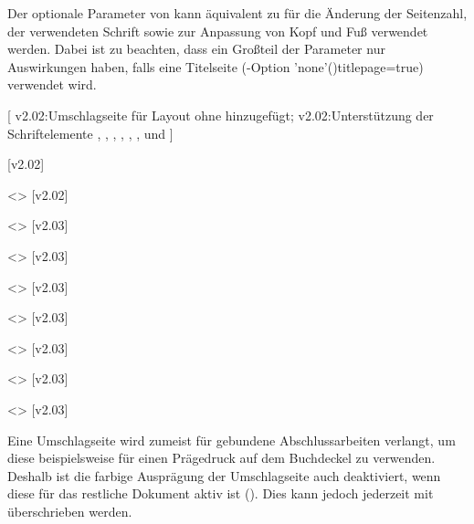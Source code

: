\begin{DeclareEntity*}{}
\begin{DeclareEntity*}{}
\begin{DeclareEntity*}{}
\begin{Declaration}
Der optionale Parameter von  kann äquivalent zu 
 für die Änderung der Seitenzahl, der verwendeten Schrift 
sowie zur Anpassung von Kopf und Fuß verwendet werden. Dabei ist zu beachten, 
dass ein Großteil der Parameter nur Auswirkungen haben, falls eine Titelseite
(\KOMAScript-Option \Option'none'(){titlepage=true}) 
verwendet wird.
\end{Declaration}

\begin{Declaration}
  {}
[%
  v2.02:Umschlagseite für Layout ohne \CD hinzugefügt;%
  v2.02:Unterstützung der Schriftelemente , 
    , , , , 
    ,  und %
]
\begin{Declaration}
  {}
  [v2.02]
\begin{Declaration}
  {}
\begin{Declaration}
  {}
  <>
  [v2.02]
\begin{Declaration}
  {}
  <>
  [v2.03]
\begin{Declaration}
  {}
  <>
  [v2.03]
\begin{Declaration}
  {}
  <>
  [v2.03]
\begin{Declaration}
  {}
  <>
  [v2.03]
\begin{Declaration}
  {}
  <>
  [v2.03]
\begin{Declaration}
  {}
  <>
  [v2.03]
\begin{Declaration}
  {}
  <>
  [v2.03]
\printdeclarationlist[Umschlagseite|!]

Eine Umschlagseite wird zumeist für gebundene Abschlussarbeiten verlangt, um 
diese beispielsweise für einen Prägedruck auf dem Buchdeckel zu verwenden. 
Deshalb ist die farbige Ausprägung der Umschlagseite auch deaktiviert, wenn 
diese für das restliche Dokument aktiv ist (). Dies kann 
jedoch jederzeit mit  überschrieben werden.


\end{Declaration}
\end{Declaration}
\end{Declaration}
\end{Declaration}
\end{Declaration}
\end{Declaration}
\end{Declaration}
\end{Declaration}
\end{Declaration}
\end{Declaration}
\end{Declaration}
\end{DeclareEntity*}
\end{DeclareEntity*}
\end{DeclareEntity*}
